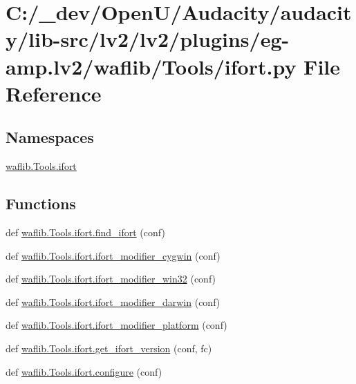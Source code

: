 \hypertarget{lv2_2plugins_2eg-amp_8lv2_2waflib_2_tools_2ifort_8py}{}\section{C\+:/\+\_\+dev/\+Open\+U/\+Audacity/audacity/lib-\/src/lv2/lv2/plugins/eg-\/amp.lv2/waflib/\+Tools/ifort.py File Reference}
\label{lv2_2plugins_2eg-amp_8lv2_2waflib_2_tools_2ifort_8py}
\subsection*{Namespaces}
\begin{DoxyCompactItemize}
\item 
 \hyperlink{namespacewaflib_1_1_tools_1_1ifort}{waflib.\+Tools.\+ifort}
\end{DoxyCompactItemize}
\subsection*{Functions}
\begin{DoxyCompactItemize}
\item 
def \hyperlink{namespacewaflib_1_1_tools_1_1ifort_aa6838492a72ffb343c49d099cbbe1a25}{waflib.\+Tools.\+ifort.\+find\+\_\+ifort} (conf)
\item 
def \hyperlink{namespacewaflib_1_1_tools_1_1ifort_aa44d118aa83e088e0ab4e7ab47d662de}{waflib.\+Tools.\+ifort.\+ifort\+\_\+modifier\+\_\+cygwin} (conf)
\item 
def \hyperlink{namespacewaflib_1_1_tools_1_1ifort_a89fe1b18d4886bfeec97636459f81d35}{waflib.\+Tools.\+ifort.\+ifort\+\_\+modifier\+\_\+win32} (conf)
\item 
def \hyperlink{namespacewaflib_1_1_tools_1_1ifort_a3078d523f12c208147b3ee500f2cbd99}{waflib.\+Tools.\+ifort.\+ifort\+\_\+modifier\+\_\+darwin} (conf)
\item 
def \hyperlink{namespacewaflib_1_1_tools_1_1ifort_a468f9dd549fcae601c2733fae8e70e25}{waflib.\+Tools.\+ifort.\+ifort\+\_\+modifier\+\_\+platform} (conf)
\item 
def \hyperlink{namespacewaflib_1_1_tools_1_1ifort_afde0bb56d9602a855a6357c8021ace77}{waflib.\+Tools.\+ifort.\+get\+\_\+ifort\+\_\+version} (conf, fc)
\item 
def \hyperlink{namespacewaflib_1_1_tools_1_1ifort_a2eceee8c0f041a660b0759d18822b668}{waflib.\+Tools.\+ifort.\+configure} (conf)
\end{DoxyCompactItemize}
